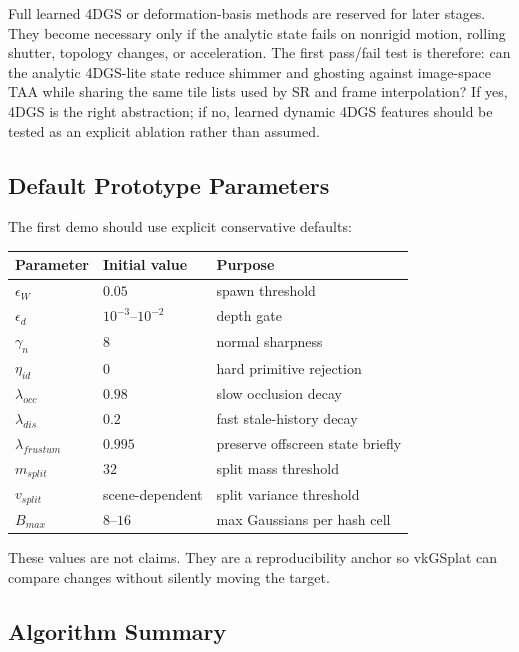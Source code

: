\documentclass[11pt]{article}
\begin{document}
Full learned 4DGS or deformation-basis methods are reserved for later stages.
They become necessary only if the analytic state fails on nonrigid motion,
rolling shutter, topology changes, or acceleration. The first pass/fail test is
therefore: can the analytic 4DGS-lite state reduce shimmer and ghosting against
image-space TAA while sharing the same tile lists used by SR and frame
interpolation? If yes, 4DGS is the right abstraction; if no, learned dynamic
4DGS features should be tested as an explicit ablation rather than assumed.

\subsection{Default Prototype Parameters}

The first demo should use explicit conservative defaults:

\begin{center}
\begin{tabular}{lll}
\toprule
Parameter & Initial value & Purpose \\
\midrule
$\epsilon_W$ & $0.05$ & spawn threshold \\
$\epsilon_d$ & $10^{-3}$--$10^{-2}$ & depth gate \\
$\gamma_n$ & $8$ & normal sharpness \\
$\eta_{id}$ & $0$ & hard primitive rejection \\
$\lambda_{occ}$ & $0.98$ & slow occlusion decay \\
$\lambda_{dis}$ & $0.2$ & fast stale-history decay \\
$\lambda_{frustum}$ & $0.995$ & preserve offscreen state briefly \\
$m_{split}$ & $32$ & split mass threshold \\
$v_{split}$ & scene-dependent & split variance threshold \\
$B_{max}$ & $8$--$16$ & max Gaussians per hash cell \\
\bottomrule
\end{tabular}
\end{center}

These values are not claims. They are a reproducibility anchor so vkGSplat can
compare changes without silently moving the target.

\subsection{Algorithm Summary}
\end{document}
